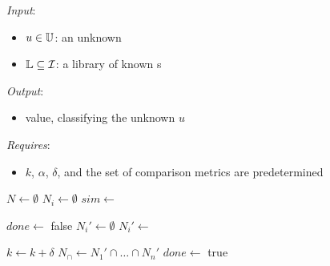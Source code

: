 \begin{algorithm}[H]
\caption{\rintersect{}}\label{alg:intersection}

\textit{Input}:
\begin{itemize}
\item $u\in\mathbb{U}{}$: an unknown \isol{}
\item $\mathbb{L}{}\subseteq\mathcal{I}{}$: a library of known \isol{}s
\end{itemize}
\textit{Output}:
\begin{itemize}
\item \SPEC{} value, classifying the unknown \isol{} $u$
\end{itemize}
\textit{Requires}:
\begin{itemize}
\item $k$, $\alpha$, $\delta$, and the set of comparison metrics \COMP{} are predetermined
\end{itemize}

\begin{algorithmic}[1]
\State $N\gets\emptyset$
                
\State$N_i \gets\emptyset$      
                
    \State $sim\gets$    
    \State {}           
    \EndFor
    \State {}    
    
    \State {}
\EndFor
\State $done\gets$ false
\State $N_i'\gets\emptyset$
\State $N_i'\gets$
\EndFor

\State $k\gets k + \delta$
\Else
\State $N_\cap\gets N_1'\cap\dots\cap N_n'$ 
\State $done\gets$ true
\EndIf
\EndWhile
\State\Return {}
\EndProcedure
\end{algorithmic}
\end{algorithm}